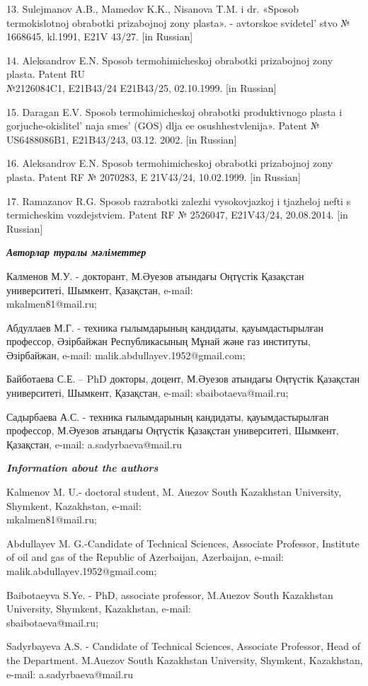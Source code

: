 \begin{refs}
13. Sulejmanov A.B., Mamedov K.K., Nisanova T.M. i dr. «Sposob
termokislotnoj obrabotki prizabojnoj zony plasta». - avtorskoe
svidetel' stvo № 1668645, kl.1991, E21V 43/27. {[}in
Russian{]}

14. Aleksandrov E.N. Sposob termohimicheskoj obrabotki prizabojnoj zony
plasta. Patent RU \\№2126084C1, E21B43/24 E21B43/25, 02.10.1999. {[}in
Russian{]}

15. Daragan E.V. Sposob termohimicheskoj obrabotki produktivnogo plasta
i gorjuche-okislitel' naja smes'{} (GOS)
dlja ee osushhestvlenija». Patent № US6488086B1, E21B43/243, 03.12.
2002. {[}in Russian{]}

16. Aleksandrov E.N. Sposob termohimicheskoj obrabotki prizabojnoj zony
plasta. Patent RF № 2070283, E 21V43/24, 10.02.1999. {[}in Russian{]}

17. Ramazanov R.G. Sposob razrabotki zalezhi vysokovjazkoj i tjazheloj
nefti s termicheskim vozdejstvi\-em. Patent RF № 2526047, E21V43/24,
20.08.2014. {[}in Russian{]}
\end{refs}

\begin{info}
\emph{{\bfseries Авторлар туралы мәліметтер}}

Калменов М.У. - докторант, М.Әуезов атындағы Оңтүстік Қазақстан
университеті, Шымкент, Қазақстан, e-mail:\\mkalmen81@mail.ru;

Абдуллаев М.Г. - техника ғылымдарының кандидаты, қауымдастырылған
профессор, Әзірбайжан Республикасының Мұнай және газ институты,
Әзірбайжан, e-mail: malik.abdullayev.1952@gmail.com;

Байботаева С.Е. -- PhD докторы, доцент, М.Әуезов атындағы Оңтүстік
Қазақстан университеті, Шымкент, Қазақстан, e-mail: sbaibotaeva@mail.ru;

Садырбаева А.С. - техника ғылымдарының кандидаты, қауымдастырылған
профессор, М.Әуезов атындағы Оңтүстік Қазақстан университеті, Шымкент,
Қазақстан, e-mail:
a.sadyrbaeva@mail.ru

\emph{{\bfseries Information about the authors}}

Kalmenov M. U.- doctoral student, M. Auezov South Kazakhstan University,
Shymkent, Kazakhstan, e-mail:\\mkalmen81@mail.ru;

Abdullayev M. G.-Candidate of Technical Sciences, Associate Professor,
Institute of oil and gas of the Republic of Azerbaijan, Azerbaijan,
e-mail: malik.abdullayev.1952@gmail.com;

Baibotaeyva S.Ye. - PhD, associate professor, M.Auezov South Kazakhstan
University, Shymkent, Kazakhstan, e-mail:\\sbaibotaeva@mail.ru;

Sadyrbayeva A.S. - Candidate of Technical Sciences, Associate Professor,
Head of the Department. M.Auezov South Kazakhstan University, Shymkent,
Kazakhstan, e-mail: a.sadyrbaeva@mail.ru
\end{info}
